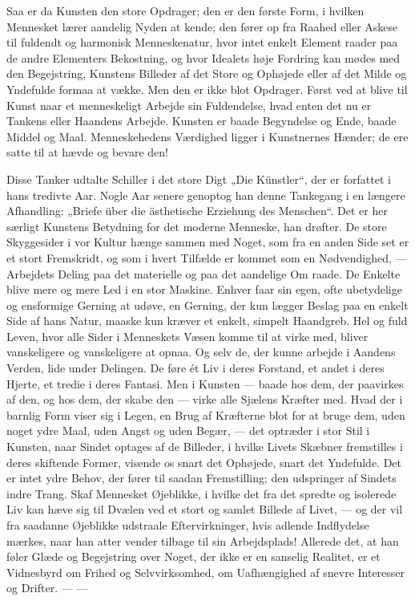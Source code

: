\documentclass[12pt,a4paper,openany]{book}
\newcommand{\opage}[1]{\marginnote{\footnotesize\textit{[#1]}}}
\begin{document}
Saa er da Kunsten den store Opdrager; den er den første
Form, i hvilken Mennesket lærer aandelig Nyden at kende;
den fører op fra Raahed eller Askese til fuldendt og harmonisk
Menneskenatur, hvor intet enkelt Element raader paa de andre
Elementers Bekostning, og hvor Idealets høje Fordring kan
mødes med den Begejstring, Kunstens Billeder af det Store og
Ophøjede eller af det Milde og Yndefulde formaa at vække.
Men den er ikke blot Opdrager. Først ved at blive til Kunst
naar et menneskeligt Arbejde sin Fuldendelse, hvad enten det
nu er Tankens eller Haandens Arbejde. Kunsten er baade
Begyndelse og Ende, baade Middel og Maal. Menneskehedens
Værdighed ligger i Kunstnernes Hænder; de ere satte til at
hævde og bevare den!

Disse Tanker udtalte Schiller i det store Digt „Die Künstler“,
der er forfattet i hans tredivte Aar. Nogle Aar senere
genoptog han denne Tankegang i en længere Afhandling: „Briefe
über die ästhetische Erziehung des Menschen“. Det er her
særligt Kunstens Betydning for det moderne Menneske, han
drøfter. De store Skyggesider i vor Kultur hænge sammen
med Noget, som fra en anden Side set er et stort Fremskridt,
og som i hvert Tilfælde er kommet som en Nødvendighed,
--- Arbejdets Deling paa det materielle og paa det aandelige Om%
\setcounter{footnote}{0}%
\opage{179}raade. De Enkelte blive mere og mere Led i en stor Maskine.
Enhver faar sin egen, ofte ubetydelige og ensformige
Gerning at udøve, en Gerning, der kun lægger Beslag paa en
enkelt Side af hans Natur, maaske kun kræver et enkelt, simpelt
Haandgreb. Hel og fuld Leven, hvor alle Sider i Menneskets
Væsen komme til at virke med, bliver vanskeligere og
vanskeligere at opnaa. Og selv de, der kunne arbejde i Aandens
Verden, lide under Delingen. De føre ét Liv i deres
Forstand, et andet i deres Hjerte, et tredie i deres Fantasi.
Men i Kunsten --- baade hos dem, der paavirkes af den, og
hos dem, der skabe den --- virke alle Sjælens Kræfter med.
Hvad der i barnlig Form viser sig i Legen, en Brug af Kræfterne
blot for at bruge dem, uden noget ydre Maal, uden Angst
og uden Begær, --- det optræder i stor Stil i Kunsten, naar
Sindet optages af de Billeder, i hvilke Livets Skæbner fremstilles
i deres skiftende Former, visende os snart det Ophøjede,
snart det Yndefulde. Det er intet ydre Behov, der fører til
saadan Fremstilling; den udspringer af Sindets indre Trang.
Skaf Mennesket Øjeblikke, i hvilke det fra det spredte og isolerede
Liv kan hæve sig til Dvælen ved et stort og samlet
Billede af Livet, --- og der vil fra saadanne Øjeblikke udstraale
Eftervirkninger, hvis adlende Indflydelse mærkes, naar han atter
vender tilbage til sin Arbejdsplads! Allerede det, at han føler
Glæde og Begejstring over Noget, der ikke er en sanselig Realitet,
er et Vidnesbyrd om Frihed og Selvvirksomhed, om Uafhængighed
af snevre Interesser og Drifter. --- ---
\end{document}
